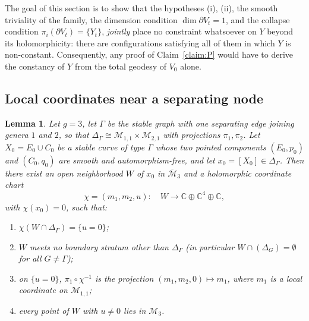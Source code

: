 \documentclass[11pt]{amsart}
\newcommand{\M}{\mathcal{M}}
\newcommand{\C}{\mathbb{C}}
\theoremstyle{plain}
\newtheorem{lemma}[theorem]{Lemma}
\theoremstyle{definition}
\theoremstyle{remark}
\begin{document}
The goal of this section is to show that the hypotheses (i), (ii), the smooth
triviality of the family, the dimension condition $\dim\partial V_t=1$, and the
collapse condition $\pi_i(\partial V_t)=\{Y_t\}$, \emph{jointly} place no constraint
whatsoever on $Y$ beyond its holomorphicity: there are configurations satisfying all
of them in which $Y$ is non-constant. Consequently, any proof of
Claim~\ref{claim:P} would have to derive the constancy of $Y$ from the total geodesy
of $V_0$ alone.

\subsection{Local coordinates near a separating node}

\begin{lemma}\label{lem:coords}
Let $g=3$, let $\Gamma$ be the stable graph with one separating edge joining genera
$1$ and $2$, so that $\Delta_\Gamma\cong \M_{1,1}\times\M_{2,1}$ with projections
$\pi_1,\pi_2$. Let $X_0=E_0\cup C_0$ be a stable curve of type $\Gamma$ whose two
pointed components $(E_0,p_0)$ and $(C_0,q_0)$ are smooth and automorphism-free, and
let $x_0=[X_0]\in\Delta_\Gamma$. Then there exist an open neighborhood $W$ of $x_0$
in $\overline{\M}_3$ and a holomorphic coordinate chart
\[
\chi=(m_1,m_2,u):\quad W\longrightarrow \C\oplus\C^4\oplus\C ,
\]
with $\chi(x_0)=0$, such that:
\begin{enumerate}
\item $\chi(W\cap\Delta_\Gamma)=\{u=0\}$;
\item $W$ meets no boundary stratum other than $\Delta_\Gamma$ (in particular
$W\cap(\Delta_{G})=\emptyset$ for all $G\neq\Gamma$);
\item on $\{u=0\}$, $\pi_1\circ\chi^{-1}$ is the projection $(m_1,m_2,0)\mapsto m_1$,
where $m_1$ is a local coordinate on $\M_{1,1}$;
\item every point of $W$ with $u\neq 0$ lies in $\M_3$.
\end{enumerate}
\end{lemma}
\end{document}
